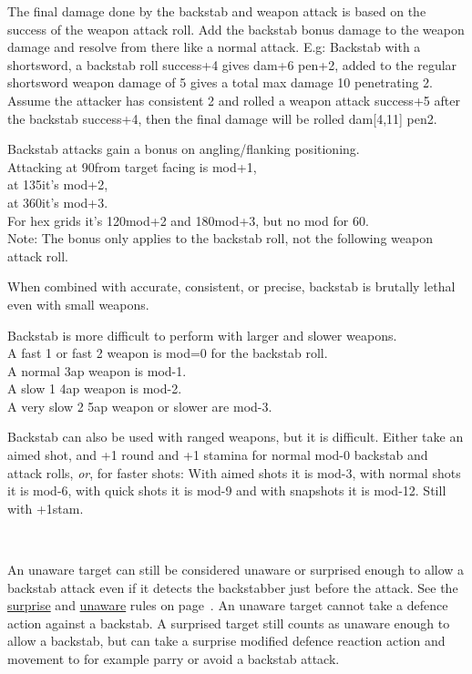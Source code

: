 The final damage done by the backstab and weapon attack is based on the success of the weapon attack roll. Add the backstab bonus damage to the weapon damage and resolve from there like a normal attack. E.g: Backstab with a shortsword, a backstab roll success+4 gives dam+6 pen+2, added to the regular shortsword weapon damage of 5 gives a total max damage 10 penetrating 2. Assume the attacker has consistent 2 and rolled a weapon attack success+5 after the backstab success+4, then the final damage will be rolled dam[4,11] pen2.

Backstab attacks gain a bonus on angling/flanking positioning. \\
Attacking at 90\degrees from target facing is mod+1, \\
at 135\degrees it's mod+2, \\
at 360\degrees it's mod+3. \\
For hex grids it's 120\degrees mod+2 and 180\degrees mod+3, but no mod for 60\degree. \\
Note: The bonus only applies to the backstab roll, not the following weapon attack roll.

When combined with accurate, consistent, or precise, backstab is brutally lethal even with small weapons.

Backstab is more difficult to perform with larger and slower weapons.\\
A fast 1 or fast 2 weapon is mod=0 for the backstab roll.\\
A normal 3ap weapon is mod-1.\\
A slow 1 4ap weapon is mod-2.\\
A very slow 2 5ap weapon or slower are mod-3.

Backstab can also be used with ranged weapons, but it is difficult. Either take an aimed shot, and +1 round and +1 stamina for normal mod-0 backstab and attack rolls, \emph{or}, for faster shots: With aimed shots it is mod-3, with normal shots it is mod-6, with quick shots it is mod-9 and with snapshots it is mod-12. Still with +1stam.

\

An unaware target can still be considered unaware or surprised enough to allow a backstab attack even if it detects the backstabber just before the attack. See the \hyperref[sec:surprise]{surprise} and \hyperref[sec:unaware]{unaware} rules on page~\pageref{sec:surprise}.
An unaware target cannot take a defence action against a backstab. A surprised target still counts as unaware enough to allow a backstab, but can take a surprise modified defence reaction action and movement to for example parry or avoid a backstab attack.


